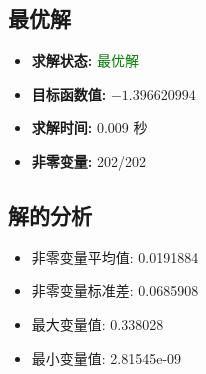 \documentclass[a4paper,11pt]{article}
\begin{document}
\subsection{最优解}
\begin{itemize}
\item \textbf{求解状态:} \textcolor{green}{最优解}
\item \textbf{目标函数值:} $-1.396620994$
\item \textbf{求解时间:} 0.009 秒
\item \textbf{非零变量:} 202/202
\end{itemize}

\subsection{解的分析}
\begin{itemize}
\item 非零变量平均值: 0.0191884
\item 非零变量标准差: 0.0685908
\item 最大变量值: 0.338028
\item 最小变量值: 2.81545e-09
\end{itemize}
\end{document}
